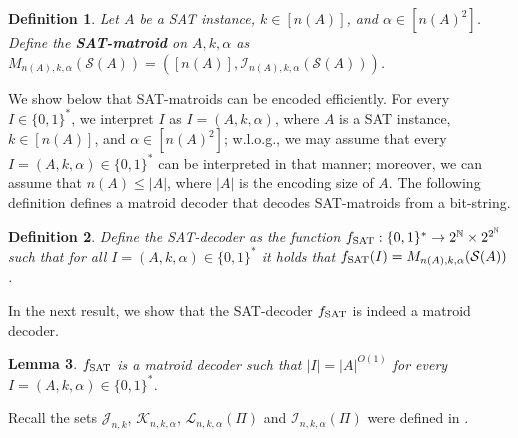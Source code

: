 \documentclass[11pt,letter]{article}
\newcommand{\cI}{{\mathcal{I}}}
\newcommand{\fs}{f_{\textnormal{SAT}}}
\newtheorem{lemma}{Lemma}[section]
\newtheorem{definition}[lemma]{Definition}
\begin{document}
	\begin{definition}
		\label{def:SATmatroid}
		Let $A$ be a \textnormal{SAT} instance, $k \in \left[n(A)\right]$, and $\alpha \in \left[  {n(A)}^{2}\right]$. Define the {\bf SAT-matroid} on $A,k,\alpha$ as $M_{n(A),k,\alpha}(\mathcal{S}(A)) = \left(\left[n(A)\right],\cI_{n(A),k,\alpha}(\mathcal{S}(A))\right)$. 
	\end{definition}
	We show below that SAT-matroids can be  encoded efficiently. %
	For every $I \in \{0,1\}^*$, we interpret $I$ as $I = (A,k,\alpha)$, where $A$ is a \textnormal{SAT} instance, $k \in \left[n(A) \right]$, and $\alpha \in \left[ {n(A)}^2 \right]$; w.l.o.g., we may assume that every $I = (A,k,\alpha) \in \{0,1\}^*$ can be interpreted in that manner; moreover, we can assume that $n(A) \leq |A|$, where $|A|$ is the encoding size of $A$. The following definition defines a matroid decoder that decodes SAT-matroids from a bit-string. %
	\begin{definition}
		\label{def:SATencoder}
		Define the {\em SAT-decoder}  as the function $f_{\textnormal{SAT}}:\{0,1\}^* \rightarrow 2^\mathbb{N} \times 2^{2^{\mathbb{N}}}$ such that for all $I = (A,k,\alpha) \in \{0,1\}^*$ it holds that $f_{\textnormal{SAT}}(I) = M_{n(A),k,\alpha}(\mathcal{S}(A))$. 
	\end{definition}
	In the next result, we show that the SAT-decoder $\fs$ is indeed a  matroid decoder.
	\begin{lemma}
		\label{lem:encodable}
		$\fs$ is a matroid decoder such that $|I| = |A|^{O(1)}$ for every $I=(A,k,\alpha) \in \{0,1\}^*$. 
	\end{lemma}
	Recall the sets  $\mathcal{J}_{n,k}$,  $\mathcal{K}_{n,k,\alpha}$, $\mathcal{L}_{n,k,\alpha}(\Pi)$ and $\cI_{n,k,\alpha}(\Pi)$ were defined in  .
\end{document}
